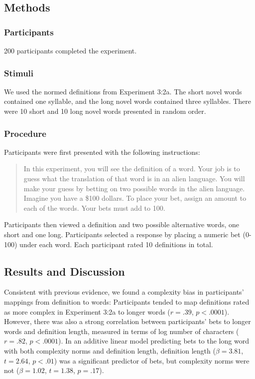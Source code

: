 \subsection{Methods}
\subsubsection{Participants}
200 participants completed the experiment.
\subsubsection{Stimuli}
We used the normed definitions from Experiment 3:2a. The short novel words contained one syllable, and the long novel words contained three syllables. There were 10 short and 10 long novel words presented in random order. 
\subsubsection{Procedure}
Participants were first presented with the following instructions:
\begin{quote}
In this experiment, you will see the definition of a word. Your job is to guess what the translation of that word is in an alien language. You will make your guess by betting on two possible words in the alien language. Imagine you have a \$100 dollars. To place your bet, assign an amount to each of the words. Your bets must add to 100.
\end{quote}
Participants then viewed a definition and two possible alternative words, one short and one long. Participants selected a response by placing a numeric bet (0-100) under each word.  Each participant rated 10 definitions in total. 

\subsection{Results and Discussion}
Consistent with previous evidence, we found a complexity bias in participants' mappings from definition to words: Participants tended to map definitions rated as more complex in Experiment 3:2a to longer words ($r = .39$,  $p< .0001$). However, there was also a strong correlation between participants' bets to longer words and definition length, measured in terms of log number of characters ($r = .82$, $p< .0001$). In an additive linear model predicting bets to the long word with both complexity norms and definition length, definition length ($\beta=3.81$, $t =2.64$, $p<.01$) was a significant predictor of bets, but complexity norms were not ($\beta=1.02$, $t =1.38$, $p=.17$). 


